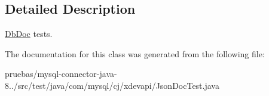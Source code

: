 \subsection{Detailed Description}
\mbox{\hyperlink{interfacecom_1_1mysql_1_1cj_1_1xdevapi_1_1_db_doc}{Db\+Doc}} tests. 

The documentation for this class was generated from the following file\+:\begin{DoxyCompactItemize}
\item 
pruebas/mysql-\/connector-\/java-\/8../src/test/java/com/mysql/cj/xdevapi/Json\+Doc\+Test.\+java\end{DoxyCompactItemize}
